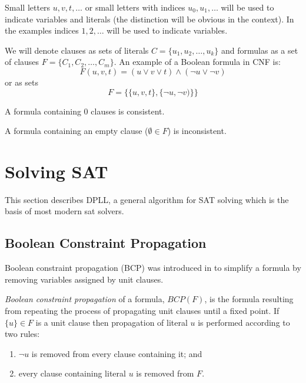 Small letters $u, v, t, \ldots$ or small letters with indices $u_0,
u_1, \ldots$ will be used to indicate variables and literals (the
distinction will be obvious in the context). In the examples
indices $1, 2, \ldots$ will be used to indicate variables.

We will denote clauses as sets of literals $C = \{ u_1, u_2, \ldots,
u_k \}$ and formulas as a set of clauses $F = \{ C_1, C_2, \ldots,
C_m \} $.  An example of a Boolean formula in CNF is:
\[
F(u, v, t) = (u \lor v \lor t) \land (\neg u \lor \neg v)
\]
or as sets
\[
F = \{ \{u, v, t\}, \{\neg u, \neg v)\}\}
\]

\begin{myprop}
  A formula containing 0 clauses is consistent.
\end{myprop}

\begin{myprop}
  A formula containing an empty clause ($\emptyset \in F$) is inconsistent.
\end{myprop}


\section{Solving SAT}
\label{sec:solving-sat}

This section describes DPLL, a general algorithm for SAT solving
which is the basis of most modern sat solvers.

\subsection{Boolean Constraint Propagation}
\label{ssec:bcp}

Boolean constraint propagation (BCP) was introduced in
\cite{Davis:1960:CPQ:321033.321034} to simplify a formula by removing
variables assigned by unit clauses.

\begin{mydef}
  \emph{Boolean constraint propagation} of a formula, $BCP(F)$, is
  the formula resulting from repeating the process of propagating
  unit clauses until a fixed point. If $\{ u \} \in F$ is a unit
  clause then propagation of literal
  $u$ is performed according to two rules:
  \begin{enumerate}
    \item $\neg u$ is removed from every clause containing it; and
    \item every clause containing literal $u$ is removed from $F$.
  \end{enumerate}
\end{mydef}

